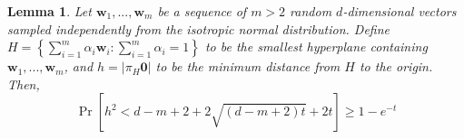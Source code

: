 \documentclass{article}
\newtheorem{lemma}{Lemma}
\theoremstyle{definition}
\DeclareMathOperator*{\probop}{Pr}
\newcommand{\prob}[1]{\ensuremath{\probop\left[{#1}\right]}}
\newcommand{\proj}[1]{\ensuremath{\pi}_{#1}}
\newcommand{\zero}{\mathbf{0}}
\newcommand{\w}{\mathbf{w}}
\begin{document}
\begin{lemma}
Let $\w_1,...,\w_m$ be a sequence of $m>2$ random $d$-dimensional vectors sampled independently from the isotropic normal distribution.
Define $H= \left\{\sum_{i=1}^m \alpha_i\w_i : \sum_{i=1}^m\alpha_i = 1 \right\}$ to be the smallest hyperplane containing $\w_1,...,\w_m$,
and $h=|\proj{H}\zero|$ to be the minimum distance from $H$ to the origin.
Then,
\begin{equation}
\prob{h^2 < d - m + 2 + 2\sqrt{(d - m + 2)t} + 2t}  \ge 1-e^{-t}
\end{equation}
\end{lemma}
\end{document}
